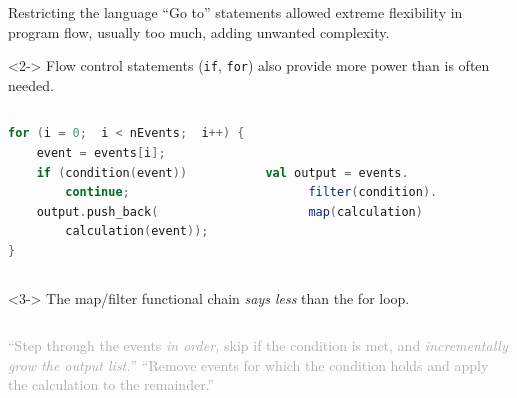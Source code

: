 \documentclass{beamer}
\begin{document}
\begin{frame}[fragile]{Restricting the language}
\vfill
``Go to'' statements allowed extreme flexibility in program flow, usually too much, adding unwanted complexity.

\vfill
\begin{uncoverenv}<2->
Flow control statements ({\small\tt if}, {\small\tt for}) also provide more power than is often needed.

\vfill
\begin{columns}
\begin{lstlisting}[language=c, basicstyle=\ttfamily\scriptsize]
for (i = 0;  i < nEvents;  i++) {
    event = events[i];
    if (condition(event))
        continue;
    output.push_back(
        calculation(event));
}
\end{lstlisting}

\begin{lstlisting}[language=scala, basicstyle=\ttfamily\scriptsize]


val output = events.
      filter(condition).
      map(calculation)


\end{lstlisting}
\end{columns}
\end{uncoverenv}

\vfill
\begin{uncoverenv}<3->
The map/filter functional chain {\it says less} than the for loop.

\small\textcolor{darkgray}{
\begin{columns}
``Step through the events {\it in order,} skip if the condition is met, and {\it incrementally grow the output list.}''
``Remove events for which the condition holds and apply the calculation to the remainder.''
\end{columns}}
\end{uncoverenv}
\end{frame}
\end{document}
